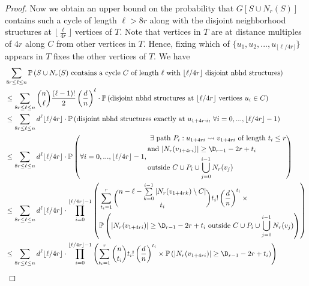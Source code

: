 \documentclass[12pt,a4paper]{article}
\newcommand{\brac}[1]{\left(#1\right)}
\def\sm{\setminus}
\def\Pr{\mathbb{P}}
\def\Dr{\D_{r-1}}
\theoremstyle{plain}
\begin{document}
\begin{proof}
Now we obtain an upper bound on the probability that $G[S \cup N_r(S)]$ contains such a cycle of length $\ell > 8r$ along with the disjoint neighborhood structures at $\lfloor \frac{\ell}{4r} \rfloor$ vertices of $T$. Note that vertices in $T$ are at distance multiples of $4r$ along $C$ from other vertices in $T$. Hence, fixing which of $\{u_1,u_2,...,u_{\lfloor\ell/4r\rfloor}\}$ appears in $T$ fixes the other vertices of $T$.
We have
\begin{align*}
		&\sum_{8r\leq \ell \leq n} \Pr\brac{\text{$S\cup N_r(S)$ contains a cycle $C$ of length $\ell$ with $\lfloor \ell/4r \rfloor$ disjoint nbhd structures} } \\
		&\leq \sum_{8r\leq \ell \leq n} \binom{n}{\ell} \frac{(\ell-1)!}{2} \left(\frac{d}{n}\right)^\ell \cdot \Pr\brac{ \text{disjoint nbhd structures at $\lfloor\ell/4r\rfloor$ vertices $u_i \in C$}} \\
		&\leq \sum_{8r\leq \ell \leq n}d^\ell \lfloor\ell/4r\rfloor \cdot \Pr\brac{ \text{disjoint nbhd structures exactly at $u_{1+4r\cdot i}$, $\forall i=0,...,\lfloor \ell/4r \rfloor -1$}} \\
		& \leq \sum_{8r\leq \ell \leq n} d^{\ell} \lfloor \ell/4r\rfloor  \cdot \Pr\brac{\forall i = 0,...,\lfloor \ell/4r\rfloor -1,
		\begin{aligned}
			&  \text{ $\exists$ path $P_i : u_{1+4ri} \rightsquigarrow v_{1+4ri}$ of length $t_i\leq r$} \\ 
			& \text{and $|N_r(v_{1+4ri})| \geq \Dr-2r+t_i$}\\
			& \text{outside $C\cup P_i\cup \bigcup\limits_{j=0}^{i-1} N_r(v_j)$}
		\end{aligned}} \\
		&\leq \sum_{8r\leq \ell \leq n} d^{\ell} \lfloor \ell/4r\rfloor \cdot 
		\prod_{i=0}^{\lfloor \ell/4r \rfloor-1} \left(
		\begin{aligned} 
			& \sum_{t_i=1}^r \binom{n-\ell- \sum\limits_{k=0}^{i-1} |N_r(v_{1+4rk}) \sm C|}{t_i} t_i! \left(\frac{d}{n}\right)^{t_i} \times \\  
			& \Pr\brac{\text{$|N_r(v_{1+4ri})| \geq \Dr-2r+t_i$ outside $C \cup P_i \cup\bigcup\limits_{j=0}^{i-1} N_r(v_j)$}} 
		\end{aligned} \right) \\
		&\leq \sum_{8r\leq \ell \leq n} d^{\ell} \lfloor \ell/4r\rfloor \cdot 
		\prod_{i=0}^{\lfloor \ell/4r \rfloor-1} \left( \sum_{t_i=1}^r \binom{n}{t_i} t_i! \left(\frac{d}{n}\right)^{t_i} \times \Pr\brac{\text{$|N_r(v_{1+4ri})| \geq \Dr-2r+t_i$} }\right)\\

\end{align*}
\end{proof}
\end{document}
